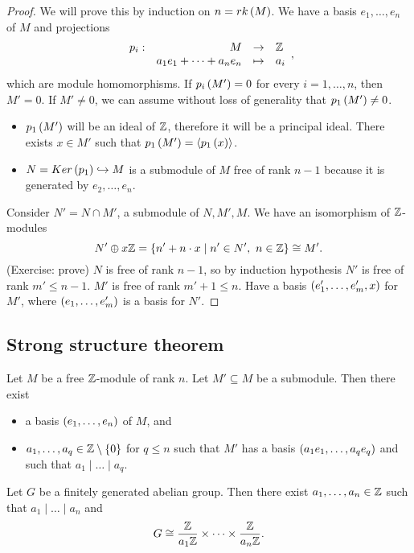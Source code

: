 \begin{proof}
We will prove this by induction on $ n = rk\left( M \right) $. We have a basis $ e_1, \dots, e_n $ of $ M $ and projections
$$ \function[p_i]{M}{\Z}{a_1e_1 + \dots + a_ne_n}{a_i}, $$
which are module homomorphisms. If $ p_i\left( M' \right) = 0 $ for every $ i = 1, \dots, n $, then $ M' = 0 $. If $ M' \ne 0 $, we can assume without loss of generality that $ p_1\left( M' \right) \ne 0 $.
\begin{itemize}
\item $ p_1\left( M' \right) $ will be an ideal of $ \mathbb{Z} $, therefore it will be a principal ideal. There exists $ x \in M' $ such that $ p_1\left( M' \right) = \left\langle p_1\left( x \right) \right\rangle $.
\item $ N = Ker\left( p_1 \right) \hookrightarrow M $ is a submodule of $ M $ free of rank $ n - 1 $ because it is generated by $ e_2, \dots, e_n $.
\end{itemize}
Consider $ N' = N \cap M' $, a submodule of $ N, M', M $. We have an isomorphism of $ \mathbb{Z} $-modules
$$ N' \oplus x\mathbb{Z} = \left\{ n' + n \cdot x \mid n' \in N', \ n \in \mathbb{Z} \right\} \cong M'. $$
(Exercise: prove) $ N $ is free of rank $ n - 1 $, so by induction hypothesis $ N' $ is free of rank $ m' \le n - 1 $. $ M' $ is free of rank $ m' + 1 \le n $. Have a basis $ \left( e_1', \dots, e_m', x \right) $ for $ M' $, where $ \left( e_1, \dots, e_m' \right) $ is a basis for $ N' $.
\end{proof}

\subsection{Strong structure theorem}

\begin{theorem}
\label{thm:structuretheorem}
Let $ M $ be a free $ \mathbb{Z} $-module of rank $ n $. Let $ M' \subseteq M $ be a submodule. Then there exist
\begin{itemize}
\item a basis $ \left( e_1, \dots, e_n \right) $ of $ M $, and
\item $ a_1, \dots, a_q \in \mathbb{Z} \setminus \left\{ 0 \right\} $ for $ q \le n $ such that $ M' $ has a basis $ \left( a_1e_1, \dots, a_qe_q \right) $ and such that $ a_1 \mid \dots \mid a_q $.
\end{itemize}
\end{theorem}

\begin{corollary}
\label{cor:fgag}
Let $ G $ be a finitely generated abelian group. Then there exist $ a_1, \dots, a_n \in \mathbb{Z} $ such that $ a_1 \mid \dots \mid a_n $ and
$$ G \cong \dfrac{\mathbb{Z}}{a_1\mathbb{Z}} \times \dots \times \dfrac{\mathbb{Z}}{a_n\mathbb{Z}}. $$
\end{corollary}

